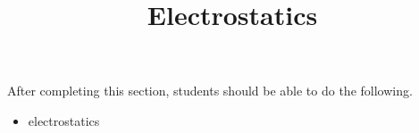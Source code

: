 \documentclass{ximera}
\title{Electrostatics}
\begin{document}
\begin{abstract}
\end{abstract}

\maketitle

\begin{sectionOutcomes}

After completing this section, students should be able to do the following.

\begin{itemize}
\item electrostatics
\end{itemize}

\end{sectionOutcomes}
\end{document}
